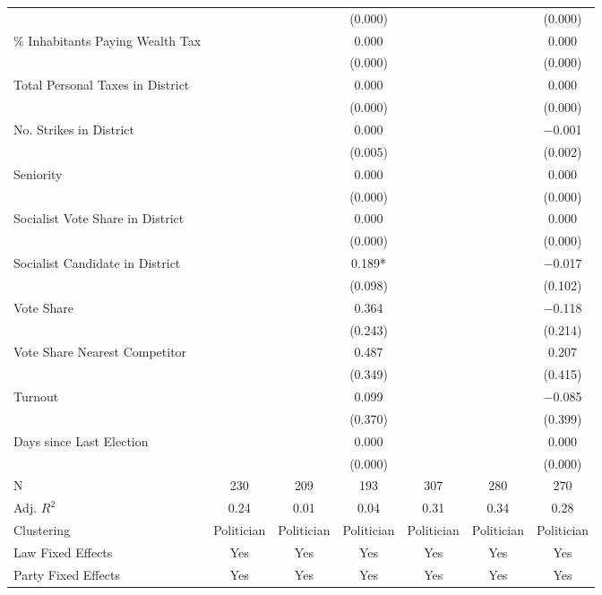 \begin{table}[!h]
{\begin{threeparttable}
\begin{tabular}[t]{lcccccc}
 &  &  & (\num{0.000}) &  &  & \vphantom{5} (\num{0.000})\\
\% Inhabitants Paying Wealth Tax &  &  & \num{0.000} &  &  & \num{0.000}\\
 &  &  & (\num{0.000}) &  &  & \vphantom{4} (\num{0.000})\\
Total Personal Taxes in District &  &  & \num{0.000} &  &  & \num{0.000}\\
 &  &  & (\num{0.000}) &  &  & \vphantom{3} (\num{0.000})\\
No. Strikes in District &  &  & \num{0.000} &  &  & \num{-0.001}\\
 &  &  & (\num{0.005}) &  &  & (\num{0.002})\\
Seniority &  &  & \num{0.000} &  &  & \num{0.000}\\
 &  &  & (\num{0.000}) &  &  & \vphantom{2} (\num{0.000})\\
Socialist Vote Share in District &  &  & \num{0.000} &  &  & \num{0.000}\\
 &  &  & (\num{0.000}) &  &  & \vphantom{1} (\num{0.000})\\
Socialist Candidate in District &  &  & \num{0.189}* &  &  & \num{-0.017}\\
 &  &  & (\num{0.098}) &  &  & (\num{0.102})\\
Vote Share &  &  & \num{0.364} &  &  & \num{-0.118}\\
 &  &  & (\num{0.243}) &  &  & (\num{0.214})\\
Vote Share Nearest Competitor &  &  & \num{0.487} &  &  & \num{0.207}\\
 &  &  & (\num{0.349}) &  &  & (\num{0.415})\\
Turnout &  &  & \num{0.099} &  &  & \num{-0.085}\\
 &  &  & (\num{0.370}) &  &  & (\num{0.399})\\
Days since Last Election &  &  & \num{0.000} &  &  & \num{0.000}\\
 &  &  & (\num{0.000}) &  &  & (\num{0.000})\\
\midrule
N & \num{230} & \num{209} & \num{193} & \num{307} & \num{280} & \num{270}\\
Adj. $R^2$ & \num{0.24} & \num{0.01} & \num{0.04} & \num{0.31} & \num{0.34} & \num{0.28}\\
Clustering & Politician & Politician & Politician & Politician & Politician & Politician\\
Law Fixed Effects & Yes & Yes & Yes & Yes & Yes & Yes\\
Party Fixed Effects & Yes & Yes & Yes & Yes & Yes & Yes\\

\end{tabular}
\end{threeparttable}}
\end{table}
